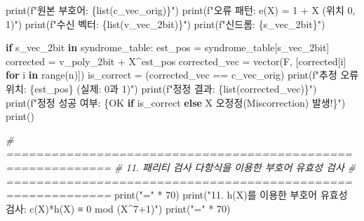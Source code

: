 \documentclass[
  oneside]{article}
\newenvironment{Shaded}{}{}
\newcommand{\BuiltInTok}[1]{\textcolor[rgb]{0.00,0.50,0.00}{#1}}
\newcommand{\CommentTok}[1]{\textcolor[rgb]{0.38,0.63,0.69}{\textit{#1}}}
\newcommand{\ControlFlowTok}[1]{\textcolor[rgb]{0.00,0.44,0.13}{\textbf{#1}}}
\newcommand{\DecValTok}[1]{\textcolor[rgb]{0.25,0.63,0.44}{#1}}
\newcommand{\KeywordTok}[1]{\textcolor[rgb]{0.00,0.44,0.13}{\textbf{#1}}}
\newcommand{\NormalTok}[1]{#1}
\newcommand{\OperatorTok}[1]{\textcolor[rgb]{0.40,0.40,0.40}{#1}}
\newcommand{\SpecialCharTok}[1]{\textcolor[rgb]{0.25,0.44,0.63}{#1}}
\newcommand{\SpecialStringTok}[1]{\textcolor[rgb]{0.73,0.40,0.53}{#1}}
\newcommand{\StringTok}[1]{\textcolor[rgb]{0.25,0.44,0.63}{#1}}
\begin{document}
\begin{Shaded}
\begin{Highlighting}[]
\BuiltInTok{print}\NormalTok{(}\SpecialStringTok{f"원본 부호어: }\SpecialCharTok{\{}\BuiltInTok{list}\NormalTok{(c\_vec\_orig)}\SpecialCharTok{\}}\SpecialStringTok{"}\NormalTok{)}
\BuiltInTok{print}\NormalTok{(}\SpecialStringTok{f"오류 패턴:   e(X) = 1 + X (위치 0, 1)"}\NormalTok{)}
\BuiltInTok{print}\NormalTok{(}\SpecialStringTok{f"수신 벡터:   }\SpecialCharTok{\{}\BuiltInTok{list}\NormalTok{(v\_vec\_2bit)}\SpecialCharTok{\}}\SpecialStringTok{"}\NormalTok{)}
\BuiltInTok{print}\NormalTok{(}\SpecialStringTok{f"신드롬:      }\SpecialCharTok{\{}\NormalTok{s\_vec\_2bit}\SpecialCharTok{\}}\SpecialStringTok{"}\NormalTok{)}

\ControlFlowTok{if}\NormalTok{ s\_vec\_2bit }\KeywordTok{in}\NormalTok{ syndrome\_table:}
\NormalTok{    est\_pos }\OperatorTok{=}\NormalTok{ syndrome\_table[s\_vec\_2bit]}
\NormalTok{    corrected }\OperatorTok{=}\NormalTok{ v\_poly\_2bit }\OperatorTok{+}\NormalTok{ X}\OperatorTok{\^{}}\NormalTok{est\_pos}
\NormalTok{    corrected\_vec }\OperatorTok{=}\NormalTok{ vector(F, [corrected[i] }\ControlFlowTok{for}\NormalTok{ i }\KeywordTok{in} \BuiltInTok{range}\NormalTok{(n)])}
\NormalTok{    is\_correct }\OperatorTok{=}\NormalTok{ (corrected\_vec }\OperatorTok{==}\NormalTok{ c\_vec\_orig)}
    \BuiltInTok{print}\NormalTok{(}\SpecialStringTok{f"추정 오류 위치: }\SpecialCharTok{\{}\NormalTok{est\_pos}\SpecialCharTok{\}}\SpecialStringTok{ (실제: 0과 1)"}\NormalTok{)}
    \BuiltInTok{print}\NormalTok{(}\SpecialStringTok{f"정정 결과: }\SpecialCharTok{\{}\BuiltInTok{list}\NormalTok{(corrected\_vec)}\SpecialCharTok{\}}\SpecialStringTok{"}\NormalTok{)}
    \BuiltInTok{print}\NormalTok{(}\SpecialStringTok{f"정정 성공 여부: }\SpecialCharTok{\{}\StringTok{\textquotesingle{}OK\textquotesingle{}} \ControlFlowTok{if}\NormalTok{ is\_correct }\ControlFlowTok{else} \StringTok{\textquotesingle{}X 오정정(Miscorrection) 발생!\textquotesingle{}}\SpecialCharTok{\}}\SpecialStringTok{"}\NormalTok{)}
\BuiltInTok{print}\NormalTok{()}

\CommentTok{\# ============================================================}
\CommentTok{\# 11. 패리티 검사 다항식을 이용한 부호어 유효성 검사}
\CommentTok{\# ============================================================}
\BuiltInTok{print}\NormalTok{(}\StringTok{"="} \OperatorTok{*} \DecValTok{70}\NormalTok{)}
\BuiltInTok{print}\NormalTok{(}\StringTok{"11. h(X)를 이용한 부호어 유효성 검사: c(X)*h(X) ≡ 0 mod (X\^{}7+1)"}\NormalTok{)}
\BuiltInTok{print}\NormalTok{(}\StringTok{"="} \OperatorTok{*} \DecValTok{70}\NormalTok{)}


\end{Highlighting}
\end{Shaded}
\end{document}
